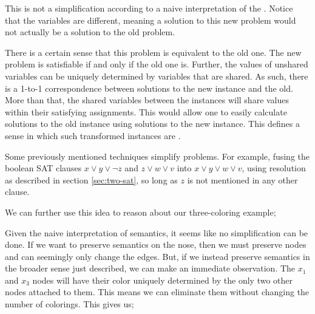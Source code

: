 This is not a simplification according to a naive interpretation of the . Notice that the variables are different, meaning a solution to this new problem would not actually be a solution to the old problem.

There is a certain sense that this problem is equivalent to the old one. The new problem is satisfiable if and only if the old one is. Further, the values of unshared variables can be uniquely determined by variables that are shared. As such, there is a 1-to-1 correspondence between solutions to the new instance and the old. More than that, the shared variables between the instances will share values within their satisfying assignments. This would allow one to easily calculate solutions to the old instance using solutions to the new instance. This defines a sense in which such transformed instances are .

Some previously mentioned techniques simplify problems. For example, fusing the boolean SAT clauses $x \vee y \vee \neg z$ and $z \vee w \vee v$ into $x \vee y \vee w \vee v$, using resolution as described in section \ref{sec:two-sat}, so long as $z$ is not mentioned in any other clause.

We can further use this idea to reason about our three-coloring example;

\begin{center}
\end{center}

Given the naive interpretation of  semantics, it seems like no simplification can be done. If we want to preserve semantics on the nose, then we must preserve nodes and can seemingly only change the edges. But, if we instead preserve semantics in the broader sense just described, we can make an immediate observation. The $x_1$ and $x_3$ nodes will have their color uniquely determined by the only two other nodes attached to them. This means we can eliminate them without changing the number of colorings. This gives us;

\begin{center}
\end{center}

